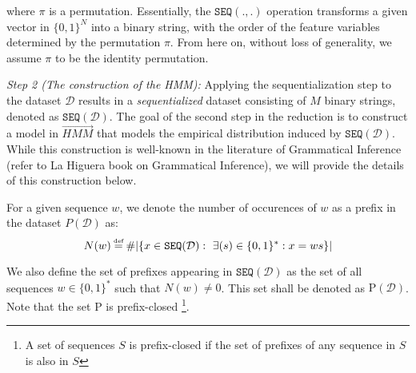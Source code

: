 where $\pi$ is a permutation. Essentially, the $\texttt{SEQ}(.,.)$ operation transforms a given vector in $\{0,1\}^{N}$ into a binary string, with the order of the feature variables determined by the permutation $\pi$. From here on, without loss of generality, we assume $\pi$ to be the identity permutation.


\emph{Step 2 (The construction of the HMM):} 
Applying the sequentialization step to the dataset $\mathcal{D}$ results in a \emph{sequentialized} dataset consisting of $M$ binary strings, denoted as $\texttt{SEQ}(\mathcal{D})$. The goal of the second step in the reduction is to construct a model in $\overrightarrow{HMM}$ that models the empirical distribution induced by $\texttt{SEQ}(\mathcal{D})$. While this construction is well-known in the literature of Grammatical Inference (refer to
La Higuera book on Grammatical Inference), we will provide the details of this construction below. 


For a given sequence $w$, we denote the number of occurences of $w$ as a prefix in the dataset $P(\mathcal{D})$ as:
$$N(w) \myeq \#|\{x \in \texttt{SEQ}(\mathcal{D}): ~ \exists (s) \in \{0,1\}^{*}: x = ws\}|$$

We also define the set of prefixes appearing in $\texttt{SEQ}(\mathcal{D})$ as the set of all sequences $w \in \{0,1\}^{*}$ such that $N(w) \neq 0$. This set shall be denoted as $\text{P}(\mathcal{D})$. Note that the set $\text{P}$ is prefix-closed \footnote{A set of sequences $S$ is prefix-closed if the set of prefixes of any sequence in $S$ is also in $S$}.

